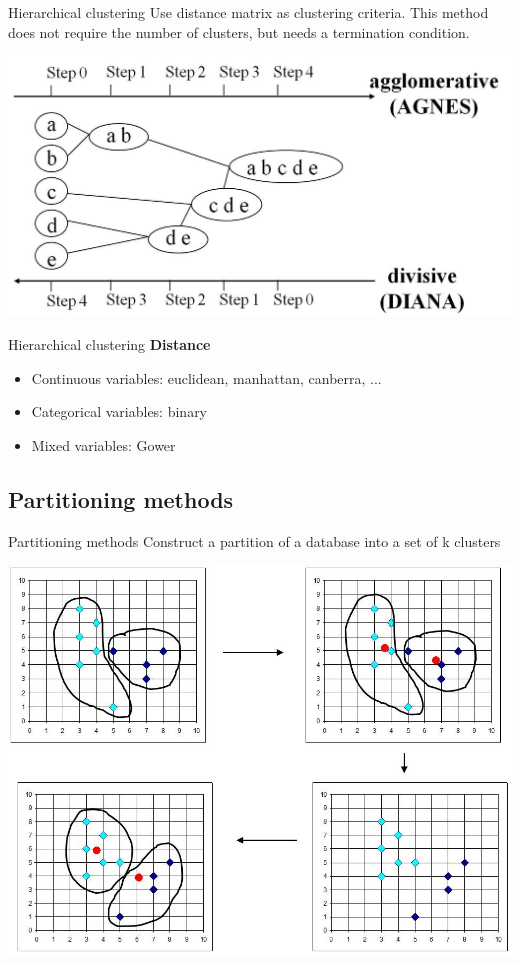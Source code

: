 \documentclass[10pt,xcolor=dvipsnames]{beamer}\usepackage[]{graphicx}\usepackage[]{color}
\begin{document}
\begin{frame}{Hierarchical clustering}
Use distance matrix as clustering criteria. This method does not require the number of clusters, but needs a termination condition.

\medskip

\includegraphics{figures/hierarchical.jpg}
\end{frame}



\begin{frame}{Hierarchical clustering}
\textbf{Distance}
\begin{itemize}
 \item Continuous variables: euclidean, manhattan, canberra, ...
 \item Categorical variables: binary
 \item Mixed variables: Gower   
\end{itemize}
\end{frame}


\subsection{Partitioning methods}

\begin{frame}{Partitioning methods}
Construct a partition of a database into a set of k clusters

\includegraphics{figures/kmeans.jpg}
\end{frame}
\end{document}
